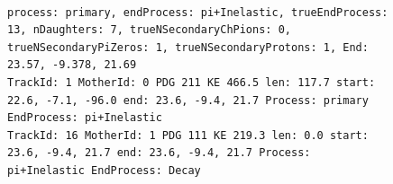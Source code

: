 \documentclass[letterpaper,12pt]{article}
\begin{document}
\begin{figure}[!hbtp]
  \begin{center}
\\
\begin{lstlisting}
process: primary, endProcess: pi+Inelastic, trueEndProcess: 13, nDaughters: 7, trueNSecondaryChPions: 0, trueNSecondaryPiZeros: 1, trueNSecondaryProtons: 1, End: 23.57, -9.378, 21.69
TrackId: 1 MotherId: 0 PDG 211 KE 466.5 len: 117.7 start: 22.6, -7.1, -96.0 end: 23.6, -9.4, 21.7 Process: primary EndProcess: pi+Inelastic
TrackId: 16 MotherId: 1 PDG 111 KE 219.3 len: 0.0 start: 23.6, -9.4, 21.7 end: 23.6, -9.4, 21.7 Process: pi+Inelastic EndProcess: Decay

\end{lstlisting}
\end{center}
\end{figure}
\end{document}
